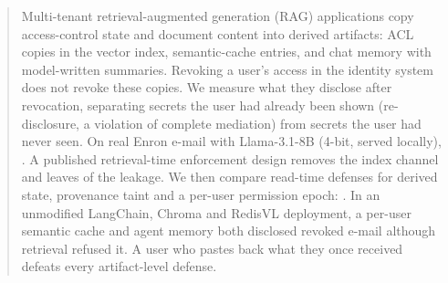 \begin{abstract}
Multi-tenant retrieval-augmented generation (RAG) applications copy access-control state and
document content into derived artifacts: ACL copies in the vector index, semantic-cache entries,
and chat memory with model-written summaries. Revoking a user's access in the identity system does
not revoke these copies. We measure what they disclose after revocation, separating secrets the user
had already been shown (re-disclosure, a violation of complete mediation) from secrets the user had
never seen. On real Enron e-mail with Llama-3.1-8B (4-bit, served locally), .
A published retrieval-time enforcement design removes the index channel and leaves  of the
leakage. We then compare read-time defenses for derived state, provenance taint and a per-user
permission epoch: . In an unmodified LangChain, Chroma and
RedisVL deployment, a per-user semantic cache and agent memory both disclosed revoked e-mail although
retrieval refused it. A user who pastes back what they once received defeats every artifact-level
defense.
\end{abstract}
